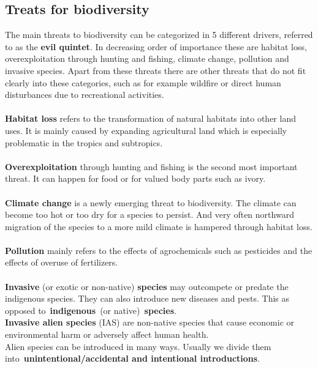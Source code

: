 \documentclass[../summary.tex]{subfiles}
\begin{document}
	
	\subsection{Treats for biodiversity} 
	The main threats to biodiversity can be categorized in 5 different drivers, referred to as the \textbf{evil quintet}. In decreasing order of importance these are habitat loss, overexploitation through hunting and fishing, climate change, pollution and invasive species. Apart from these threats there are other threats that do not fit clearly into these categories, such as for example wildfire or direct human disturbances due to recreational activities.
	\\
	\\
	\textbf{Habitat loss} refers to the transformation of natural habitats into other land uses. It is mainly caused by expanding agricultural land which is especially problematic in the tropics and subtropics.
	\\
	\\
	\textbf{Overexploitation} through hunting and fishing is the second most important threat. It can happen for food or for valued body parts such as ivory.
	\\
	\\
	\textbf{Climate change} is a newly emerging threat to biodiversity. The climate can become too hot or too dry for a species to persist. And very often northward migration of the species to a more mild climate is hampered through habitat loss.
	\\
	\\
	\textbf{Pollution} mainly refers to the effects of agrochemicals such as pesticides and the effects of overuse of fertilizers.
	\\
	\\
	\textbf{Invasive} (or exotic or non-native) \textbf{species} may outcompete or predate the indigenous species. They can also introduce new diseases and pests. This as opposed to \textbf{indigenous} (or native) \textbf{species}. \\
	\textbf{Invasive alien species} (IAS) are non-native species that cause economic or environmental harm or adversely affect human health.  \\
	Alien species can be introduced in many ways. Usually we divide them into \textbf{unintentional/accidental and intentional introductions}. 
\end{document}
